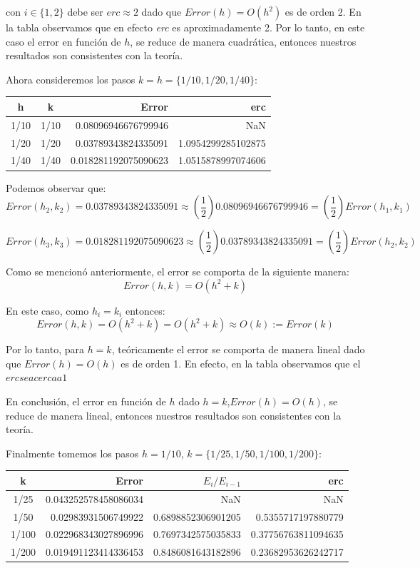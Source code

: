 \documentclass[11pt]{article}
\theoremstyle{definition}
\begin{document}
    con \(i\in \{ 1,2 \}\) debe ser $erc\approx 2 $ dado que
\(Error(h)=O(h^2)\) es de orden 2. En la tabla observamos que en efecto \textit{erc} es aproximadamente 2. Por lo tanto, en este caso el error en función de $h$, se reduce de manera cuadrática, entonces nuestros resultados son consistentes con la teoría.

    Ahora consideremos los pasos \(k = h = \{ 1/10, 1/20, 1/40 \}\):

\begin{center}
    \begin{tabular}{cc|rr} 
 \hline 
h & k & Error & erc \\ \hline 
1/10 & 1/10 & 0.08096946676799946 & NaN \\ 
1/20 & 1/20 & 0.03789343824335091 & 1.0954299285102875 \\ 
1/40 & 1/40 & 0.018281192075090623 & 1.0515878997074606 \\ 
\hline 
 \end{tabular}
\end{center}

    Podemos observar que:
\[Error(h_{2},k_{2})=0.03789343824335091\approx\left(\frac{1}{2}\right)0.08096946676799946=\left(\frac{1}{2}\right)Error(h_{1},k_{1})\]

    \[Error(h_{3},k_{3})=0.018281192075090623\approx\left(\frac{1}{2}\right)0.03789343824335091=\left(\frac{1}{2}\right)Error(h_{2},k_{2})\]

    Como se mencionó anteriormente, el error se comporta de la siguiente
manera: \[Error(h,k)=O(h^2 + k)\]

    En este caso, como \(h_i=k_i\) entonces:
\[Error(h,k)=O(h^2 + k)= O(h^2 + k) \approx O(k):=Error(k)\]

    Por lo tanto, para \(h=k\), teóricamente el error se comporta de manera
lineal dado que \(Error(h)=O(h)\) es de orden 1. En efecto, en la tabla observamos que el $erc se acerca a 1$

    En conclusión, el error en función de \(h\) dado
\(h=k\),$Error(h)=O(h) $, se reduce de manera lineal, entonces
nuestros resultados son consistentes con la teoría.

    Finalmente tomemos los pasos \(h = 1/10\),
\(k = \{1/25, 1/50, 1/100, 1/200\}\):

    

\begin{center}
    \begin{tabular}{c|rrr} 
 \hline 
k & Error & $E_i/E_{i-1}$ & erc \\ \hline 
1/25 & 0.043252578458086034 & NaN & NaN \\ 
1/50 & 0.02983931506749922 & 0.6898852306901205 & 0.5355717197880779 \\ 
1/100 & 0.022968343027896996 & 0.7697342575035833 & 0.37756763811094635 \\ 
1/200 & 0.019491123414336453 & 0.8486081643182896 & 0.23682953626242717 \\ 
\hline 
 \end{tabular}
\end{center}
    
\end{document}
